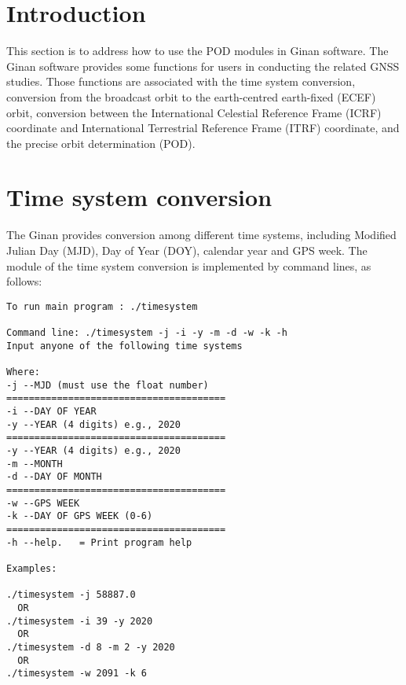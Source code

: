 \section{Introduction}
This section is to address how to use the POD modules in Ginan software. The Ginan software provides some functions for users in conducting the related GNSS studies. Those functions are associated with the time system conversion, conversion from the broadcast orbit to the earth-centred earth-fixed (ECEF) orbit, conversion between the International Celestial Reference Frame (ICRF) coordinate and International Terrestrial Reference Frame (ITRF) coordinate, and the precise orbit determination (POD).  


\section{Time system conversion}
The Ginan provides conversion among different time systems, including Modified Julian Day (MJD), Day of Year (DOY), calendar year and GPS week. The module of the time system conversion is implemented by command lines, as follows:
\begin{verbatim}
To run main program : ./timesystem

Command line: ./timesystem -j -i -y -m -d -w -k -h
Input anyone of the following time systems

Where:
-j --MJD (must use the float number)
=======================================
-i --DAY OF YEAR
-y --YEAR (4 digits) e.g., 2020
=======================================
-y --YEAR (4 digits) e.g., 2020
-m --MONTH
-d --DAY OF MONTH
=======================================
-w --GPS WEEK
-k --DAY OF GPS WEEK (0-6)
=======================================
-h --help.   = Print program help

Examples:

./timesystem -j 58887.0
  OR
./timesystem -i 39 -y 2020
  OR
./timesystem -d 8 -m 2 -y 2020
  OR
./timesystem -w 2091 -k 6
\end{verbatim}

